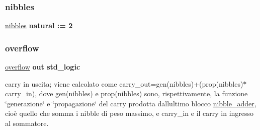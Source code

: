 \mbox{\label{group___carry_loockahead_ga0b63b586531492d0fa882246cca071c1}} 
\subsubsection{\texorpdfstring{nibbles}{nibbles}}
{\footnotesize\ttfamily \hyperlink{group___carry_loockahead_ga0b63b586531492d0fa882246cca071c1}{nibbles} {\bfseries \textcolor{vhdlchar}{ }} {\bfseries \textcolor{vhdlchar}{natural}\textcolor{vhdlchar}{ }\textcolor{vhdlchar}{ }\textcolor{vhdlchar}{\+:}\textcolor{vhdlchar}{=}\textcolor{vhdlchar}{ }\textcolor{vhdlchar}{ } \textcolor{vhdldigit}{2} \textcolor{vhdlchar}{ }} \hspace{0.3cm}{\ttfamily [Generic]}}

\mbox{\label{group___carry_loockahead_ga9650307dde287e0bcfa1e26370c006c2}} 
\subsubsection{\texorpdfstring{overflow}{overflow}}
{\footnotesize\ttfamily \hyperlink{group___carry_loockahead_ga9650307dde287e0bcfa1e26370c006c2}{overflow} {\bfseries \textcolor{vhdlchar}{out}\textcolor{vhdlchar}{ }} {\bfseries \textcolor{vhdlchar}{std\+\_\+logic}\textcolor{vhdlchar}{ }} \hspace{0.3cm}{\ttfamily [Port]}}

carry in uscita; viene calcolato come carry\+\_\+out=gen(nibbles)+(prop(nibbles)$\ast$carry\+\_\+in), dove gen(nibbles) e prop(nibbles) sono, rispettivamente, la funzione \char`\"{}generazione\char`\"{} e \char`\"{}propagazione\char`\"{} del carry prodotta dall\textquotesingle{}ultimo blocco \hyperlink{classnibble__adder}{nibble\+\_\+adder}, cioè quello che somma i nibble di peso massimo, e carry\+\_\+in e\textquotesingle{} il carry in ingresso al sommatore. \mbox{\label{group___carry_loockahead_ga19afe0b89973d7fc29362431f2e828b7}} 
